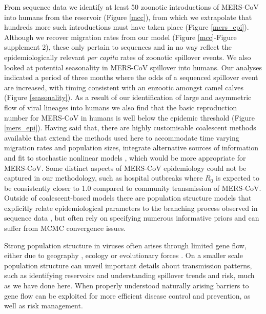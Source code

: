 \documentclass[9pt,lineno]{elife}
\begin{document}
From sequence data we identify at least 50 zoonotic introductions of MERS-CoV into humans from the reservoir (Figure \ref{mcc}), from which we extrapolate that hundreds more such introductions must have taken place (Figure \ref{mers_epi}).
Although we recover migration rates from our model (Figure \ref{mcc}-Figure supplement 2), these only pertain to sequences and in no way reflect the epidemiologically relevant \textit{per capita} rates of zoonotic spillover events.
We also looked at potential seasonality in MERS-CoV spillover into humans.
Our analyses indicated a period of three months where the odds of a sequenced spillover event are increased, with timing consistent with an enzootic amongst camel calves (Figure \ref{seasonality}).
As a result of our identification of large and asymmetric flow of viral lineages into humans we also find that the basic reproduction number for MERS-CoV in humans is well below the epidemic threshold (Figure \ref{mers_epi}).
Having said that, there are highly customisable coalescent methods available that extend the methods used here to accommodate time varying migration rates and population sizes, integrate alternative sources of information and fit to stochastic nonlinear models \citep{rasmussen_phylodynamic_2014}, which would be more appropriate for MERS-CoV.
Some distinct aspects of MERS-CoV epidemiology could not be captured in our methodology, such as hospital outbreaks where $R_{0}$ is expected to be consistently closer to 1.0 compared to community transmission of MERS-CoV.
Outside of coalescent-based models there are population structure models that explicitly relate epidemiological parameters to the branching process observed in sequence data \citep{kuhnert_phylodynamics_2016}, but often rely on specifying numerous informative priors and can suffer from MCMC convergence issues.

Strong population structure in viruses often arises through limited gene flow, either due to geography \citep{dudas_virus_2017}, ecology \citep{smith_dating_2009} or evolutionary forces \citep{turner_genomic_2005,dudas_reassortment_2015}.
On a smaller scale population structure can unveil important details about transmission patterns, such as identifying reservoirs and understanding spillover trends and risk, much as we have done here.
When properly understood naturally arising barriers to gene flow can be exploited for more efficient disease control and prevention, as well as risk management.
\end{document}
